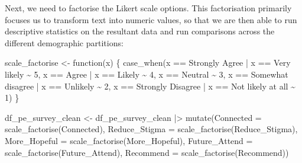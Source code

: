 \documentclass[
  letterpaper,
  DIV=11,
  numbers=noendperiod]{scrartcl}
\newenvironment{Shaded}{\begin{snugshade}}{\end{snugshade}}
\newcommand{\AttributeTok}[1]{\textcolor[rgb]{0.40,0.45,0.13}{#1}}
\newcommand{\ControlFlowTok}[1]{\textcolor[rgb]{0.00,0.23,0.31}{#1}}
\newcommand{\DecValTok}[1]{\textcolor[rgb]{0.68,0.00,0.00}{#1}}
\newcommand{\FunctionTok}[1]{\textcolor[rgb]{0.28,0.35,0.67}{#1}}
\newcommand{\NormalTok}[1]{\textcolor[rgb]{0.00,0.23,0.31}{#1}}
\newcommand{\OtherTok}[1]{\textcolor[rgb]{0.00,0.23,0.31}{#1}}
\newcommand{\SpecialCharTok}[1]{\textcolor[rgb]{0.37,0.37,0.37}{#1}}
\newcommand{\StringTok}[1]{\textcolor[rgb]{0.13,0.47,0.30}{#1}}
\begin{document}
Next, we need to factorise the Likert scale options. This factorisation
primarily focuses us to transform text into numeric values, so that we
are then able to run descriptive statistics on the resultant data and
run comparisons across the different demographic partitions:

\begin{Shaded}
\begin{Highlighting}[]
\NormalTok{scale\_factorise }\OtherTok{\textless{}{-}} \ControlFlowTok{function}\NormalTok{(x) \{}
  \FunctionTok{case\_when}\NormalTok{(x }\SpecialCharTok{==} \StringTok{\textquotesingle{}Strongly Agree\textquotesingle{}} \SpecialCharTok{|}\NormalTok{ x }\SpecialCharTok{==} \StringTok{\textquotesingle{}Very likely\textquotesingle{}} \SpecialCharTok{\textasciitilde{}} \DecValTok{5}\NormalTok{,}
\NormalTok{            x }\SpecialCharTok{==} \StringTok{\textquotesingle{}Agree\textquotesingle{}} \SpecialCharTok{|}\NormalTok{ x }\SpecialCharTok{==} \StringTok{\textquotesingle{}Likely\textquotesingle{}} \SpecialCharTok{\textasciitilde{}} \DecValTok{4}\NormalTok{,}
\NormalTok{            x }\SpecialCharTok{==} \StringTok{\textquotesingle{}Neutral\textquotesingle{}} \SpecialCharTok{\textasciitilde{}} \DecValTok{3}\NormalTok{,}
\NormalTok{            x }\SpecialCharTok{==} \StringTok{\textquotesingle{}Somewhat disagree\textquotesingle{}} \SpecialCharTok{|}\NormalTok{ x }\SpecialCharTok{==} \StringTok{\textquotesingle{}Unlikely\textquotesingle{}} \SpecialCharTok{\textasciitilde{}} \DecValTok{2}\NormalTok{,}
\NormalTok{            x }\SpecialCharTok{==} \StringTok{\textquotesingle{}Strongly Disagree\textquotesingle{}} \SpecialCharTok{|}\NormalTok{ x }\SpecialCharTok{==} \StringTok{\textquotesingle{}Not likely at all\textquotesingle{}} \SpecialCharTok{\textasciitilde{}} \DecValTok{1}\NormalTok{)}
\NormalTok{\}}

\NormalTok{df\_pe\_survey\_clean }\OtherTok{\textless{}{-}}
\NormalTok{df\_pe\_survey\_clean }\SpecialCharTok{|\textgreater{}} 
  \FunctionTok{mutate}\NormalTok{(}\AttributeTok{Connected =} \FunctionTok{scale\_factorise}\NormalTok{(Connected),}
         \AttributeTok{Reduce\_Stigma =} \FunctionTok{scale\_factorise}\NormalTok{(Reduce\_Stigma),}
         \AttributeTok{More\_Hopeful =} \FunctionTok{scale\_factorise}\NormalTok{(More\_Hopeful),}
         \AttributeTok{Future\_Attend =} \FunctionTok{scale\_factorise}\NormalTok{(Future\_Attend),}
         \AttributeTok{Recommend =} \FunctionTok{scale\_factorise}\NormalTok{(Recommend))}
\end{Highlighting}
\end{Shaded}
\end{document}
